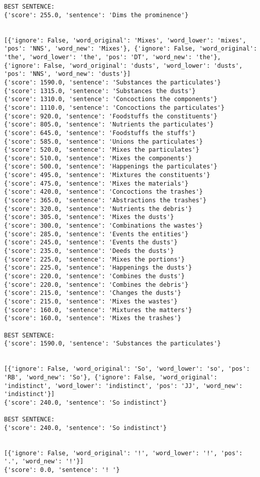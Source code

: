 \documentclass[12pt,a4paper,oneside]{book}
\begin{document}
\begin{verbatim}
BEST SENTENCE:
{'score': 255.0, 'sentence': 'Dims the prominence'}


[{'ignore': False, 'word_original': 'Mixes', 'word_lower': 'mixes', 'pos': 'NNS', 'word_new': 'Mixes'}, {'ignore': False, 'word_original': 'the', 'word_lower': 'the', 'pos': 'DT', 'word_new': 'the'}, {'ignore': False, 'word_original': 'dusts', 'word_lower': 'dusts', 'pos': 'NNS', 'word_new': 'dusts'}]
{'score': 1590.0, 'sentence': 'Substances the particulates'}
{'score': 1315.0, 'sentence': 'Substances the dusts'}
{'score': 1310.0, 'sentence': 'Concoctions the components'}
{'score': 1110.0, 'sentence': 'Concoctions the particulates'}
{'score': 920.0, 'sentence': 'Foodstuffs the constituents'}
{'score': 805.0, 'sentence': 'Nutrients the particulates'}
{'score': 645.0, 'sentence': 'Foodstuffs the stuffs'}
{'score': 585.0, 'sentence': 'Unions the particulates'}
{'score': 520.0, 'sentence': 'Mixes the particulates'}
{'score': 510.0, 'sentence': 'Mixes the components'}
{'score': 500.0, 'sentence': 'Happenings the particulates'}
{'score': 495.0, 'sentence': 'Mixtures the constituents'}
{'score': 475.0, 'sentence': 'Mixes the materials'}
{'score': 420.0, 'sentence': 'Concoctions the trashes'}
{'score': 365.0, 'sentence': 'Abstractions the trashes'}
{'score': 320.0, 'sentence': 'Nutrients the debris'}
{'score': 305.0, 'sentence': 'Mixes the dusts'}
{'score': 300.0, 'sentence': 'Combinations the wastes'}
{'score': 285.0, 'sentence': 'Events the entities'}
{'score': 245.0, 'sentence': 'Events the dusts'}
{'score': 235.0, 'sentence': 'Deeds the dusts'}
{'score': 225.0, 'sentence': 'Mixes the portions'}
{'score': 225.0, 'sentence': 'Happenings the dusts'}
{'score': 220.0, 'sentence': 'Combines the dusts'}
{'score': 220.0, 'sentence': 'Combines the debris'}
{'score': 215.0, 'sentence': 'Changes the dusts'}
{'score': 215.0, 'sentence': 'Mixes the wastes'}
{'score': 160.0, 'sentence': 'Mixtures the matters'}
{'score': 160.0, 'sentence': 'Mixes the trashes'}

BEST SENTENCE:
{'score': 1590.0, 'sentence': 'Substances the particulates'}


[{'ignore': False, 'word_original': 'So', 'word_lower': 'so', 'pos': 'RB', 'word_new': 'So'}, {'ignore': False, 'word_original': 'indistinct', 'word_lower': 'indistinct', 'pos': 'JJ', 'word_new': 'indistinct'}]
{'score': 240.0, 'sentence': 'So indistinct'}

BEST SENTENCE:
{'score': 240.0, 'sentence': 'So indistinct'}


[{'ignore': False, 'word_original': '!', 'word_lower': '!', 'pos': '.', 'word_new': '!'}]
{'score': 0.0, 'sentence': '! '}


\end{verbatim}
\end{document}
